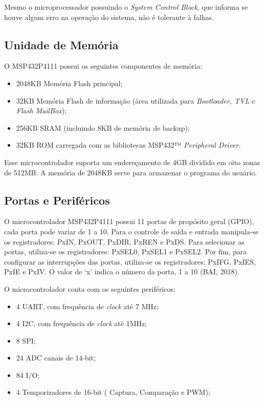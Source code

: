 Mesmo o microprocessador possuindo o \textit{System Control Block}, que informa se houve algum erro na operação do sistema, não é tolerante à falhas. 

\subsection{Unidade de Memória}

O MSP432P4111 possui os seguintes componentes de memória:

\begin{itemize}
	\item 2048KB Memória Flash principal;
	\item 32KB Memória Flash de informação (área utilizada para \textit{Bootloader, TVL} e \textit{Flash MailBox});
	\item 256KB SRAM (incluindo 8KB de memória de backup);
	\item 32KB ROM carregada com as bibliotecas MSP432™ \textit{Peripheral Driver}.
\end{itemize}

Esse microcontrolador suporta um endereçamento de 4GB dividido em oito zonas de 512MB. A memória de 2048KB serve para armazenar o programa do usuário.

\subsection{Portas e Periféricos}

O microcontrolador MSP432P4111 possui 11 	portas de propósito geral (GPIO), cada porta pode variar de 1 a 10. Para o controle de saída e entrada manipula-se os registradores: PxIN, PxOUT, PxDIR, PxREN e PxDS. Para selecionar as portas, utiliza-se os registradores: PxSEL0, PxSEL1 e PxSEL2. Por fim, para configurar as interrupções das portas, utiliza-se os registradores: PxIFG, PxIES, PxIE e PxIV. O valor de ‘x’ indica o número da porta, 1 a 10 (BAI, 2018).

O microcontrolador conta com os seguintes periféricos:

\begin{itemize}
	\item 4 UART, com frequência de \textit{clock} até 7 MHz;
	\item 4 I2C, com frequência de \textit{clock} até 1MHz;
	\item 8 SPI;
	\item 24 ADC canais de 14-bit;
	\item 84 I/O;
	\item 4 Temporizadores de 16-bit ( Captura, Comparação e PWM);
\end{itemize}

